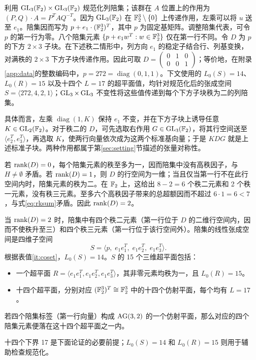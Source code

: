 \documentclass[11pt,a4paper]{article}
\begin{document}
利用 $\operatorname{GL}_3(\mathbb{F}_2)\times\operatorname{GL}_3(\mathbb{F}_2)$ 规范化列陪集；该群在 $A$ 位置上的作用为 $(P,Q)\cdot A=P^TAQ^{-T}$。因为 $\operatorname{GL}_3(\mathbb{F}_2)$ 在 $\mathbb{F}_2^3\setminus\{0\}$ 上传递作用，左乘可以将 $u$ 送至 $e_1$。陪集因而写为 $p+e_1\cdot(\mathbb{F}_2^3)^T$，其中 $p$ 为固定基矩阵。调整陪集代表，可令 $p$ 的第一行为零。八个陪集元素 $\{p+e_1w^T:w\in\mathbb{F}_2^3\}$ 仅在第一行不同。令 $D$ 为 $p$ 的下方 $2\times3$ 子块。在下述秩二情形中，列方向 $e_1$ 的稳定子结合行、列基变换，对满秩的 $2\times3$ 下方子块传递作用。因此可取 $D=\left(\begin{smallmatrix}0&1&0\\0&0&1\end{smallmatrix}\right)$；等价地，在附录\ref{app:data}的整数编码中，$p=272=\operatorname{diag}(0,1,1)$。下文使用的 $L_0(S)=14$、$L_0(R)=15$ 以及十四个 $L=17$ 的超平面值，均针对规范化后的张成空间 $S=\langle272,4,2,1\rangle$；$\operatorname{GL}_3\times\operatorname{GL}_3$ 不变性将这些值传递到每个下方子块秩为二的列陪集。

具体而言，左乘 $\operatorname{diag}(1,K)$ 保持 $e_1$ 不变，并在下方子块上诱导任意 $K\in\operatorname{GL}_2(\mathbb{F}_2)$。对于秩二的 $D$，可先选取右作用 $G\in\operatorname{GL}_3(\mathbb{F}_2)$，将其行空间送至 $\langle e_2^T,e_3^T\rangle$，再选取 $K$，使两行向量依次成为这两个标准基向量；于是 $KDG$ 就是上述标准子块。两种作用都属于第\ref{sec:setting}节描述的张量对称性。

若 $\operatorname{rank}(D)=0$，每个陪集元素的秩至多为一，因而陪集中没有高秩因子，与 $H\ne\emptyset$ 矛盾。若 $\operatorname{rank}(D)=1$，则 $D$ 的行空间为一维；当且仅当第一行不在此行空间内时，陪集元素的秩为二。在 $\mathbb{F}_2$ 上，这给出 $8-2=6$ 个秩二元素和 2 个秩一元素，没有秩三元素。至多六个高秩因子带来的总超额因而不超过 $6\cdot1=6<7$，与式\eqref{eq:rksum}矛盾。因此 $\operatorname{rank}(D)=2$。

当 $\operatorname{rank}(D)=2$ 时，陪集中有四个秩二元素（第一行位于 $D$ 的二维行空间内，因而不使秩升至三）和四个秩三元素（第一行位于该行空间外）。陪集的线性张成空间是四维子空间
\[
  S = \langle p,\; e_1e_1^T,\; e_1e_2^T,\; e_1e_3^T\rangle.
\]
根据表值\ref{it:coset}，$L_0(S)=14$。$S$ 的 15 个三维超平面包括：
\begin{itemize}
  \item 一个超平面 $R=\langle e_1e_1^T,e_1e_2^T,e_1e_3^T\rangle$，其非零元素均秩为一，且 $L_0(R)=15$。
  \item 十四个超平面，分别对应 $(\mathbb{F}_2^3)^T\cong\mathbb{F}_2^3$ 中的十四个仿射平面，每个均有 $L=17$。
\end{itemize}
若四个陪集标签（第一行向量）构成 $\operatorname{AG}(3,2)$ 的一个仿射平面，那么对应的四个陪集元素便落在这十四个超平面之一内。

十四个下界 17 是下面论证的必要前提；$L_0(S)=14$ 和 $L_0(R)=15$ 则用于辅助检查规范化。
\end{document}
